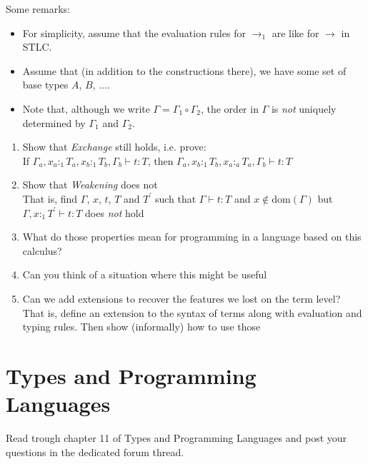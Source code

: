 \begin{prooftree}
\end{prooftree}
Some remarks:
\begin{itemize}
  \item For simplicity, assume that the evaluation rules for $\rightarrow_1$ are like for $\rightarrow$ in STLC.
  \item Assume that (in addition to the constructions there), we have some set of base types $A$, $B$, $\dots$.
  \item Note that, although we write \(\Gamma = \Gamma_1\circ\Gamma_2\), the order in \(\Gamma\) is \emph{not}
    uniquely determined by \(\Gamma_1\) and \(\Gamma_2\).
\end{itemize}


\begin{enumerate}
  \item Show that \emph{Exchange} still holds, i.e. prove: \\
    If $\Gamma_a,x_a:_1 T_a, x_b :_1 T_b, \Gamma_b\vdash t:T$, then 
    $\Gamma_a, x_b:_1 T_b, x_a:_a T_a, \Gamma_b \vdash t:T$
  \item Show that \emph{Weakening} does not\\
    That is, find $\Gamma$, $x$, $t$, $T$ and $T^{\prime}$ such that 
    $\Gamma\vdash t:T$ and $x\notin\mathrm{dom}(\Gamma)$ but
    $\Gamma, x:_1 T^{\prime}\vdash t:T$ does \emph{not} hold
  \item What do those properties mean for programming in a language based on this calculus?
  \item Can you think of a situation where this might be useful
  \item Can we add extensions to recover the features we lost on the term level?\\
    That is, define an extension to the syntax of terms along with evaluation and typing rules.
    Then show (informally) how to use those
\end{enumerate}

\section{Types and Programming Languages}
Read trough chapter 11 of Types and Programming Languages and post your questions in the dedicated forum thread.
